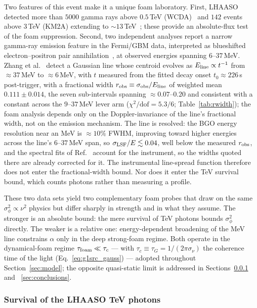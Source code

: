 \documentclass[aps,prd,onecolumn,amsmath,amssymb]{revtex4-2}
\begin{document}
Two features of this event make it a unique foam laboratory.
First, LHAASO detected more than $5000$ gamma rays above $0.5$\,TeV
(WCDA)~\cite{LHAASOWCDA2023} and $142$ events above $3$\,TeV (KM2A) extending to
$\sim\!13$\,TeV~\cite{LHAASOTeV2023}; these provide an absolute-flux
test of the foam suppression.  Second, two independent analyses report a
narrow gamma-ray emission feature in the Fermi/GBM data, interpreted as
blueshifted electron--positron pair
annihilation~\cite{Ravasio2024,YQZhang2024}, at observed energies
spanning $6$--$37$\,MeV.  Zhang et al.~\cite{YQZhang2024} detect a
Gaussian line whose centroid evolves as $E_{\rm line}\propto t^{-1}$
from $\approx37$\,MeV to $\approx6$\,MeV, with $t$ measured from the
fitted decay onset $t_0\approx226$\,s post-trigger, with a fractional width
$r_{\rm obs}\equiv\sigma_{\rm obs}/E_{\rm line}$ of weighted mean
$0.111\pm0.014$, the seven sub-intervals spanning $\approx0.07$--$0.20$ and
consistent with a constant across the $9$--$37$\,MeV lever arm
($\chi^2/\mathrm{dof}=5.3/6$; Table~\ref{tab:rwidth}); the foam analysis depends only
on the Doppler-invariance of the line's fractional width, not on the
emission mechanism.
The line is resolved: the BGO energy resolution near an MeV is
$\approx\!10\%$ FWHM, improving toward higher energies across the line's
$6$--$37$\,MeV span, so $\sigma_{\rm LSF}/E\lesssim0.04$, well below the
measured $r_{\rm obs}$, and the spectral fits of Ref.~\cite{YQZhang2024}
account for the instrument, so the widths quoted there are already
corrected for it.  The instrumental line-spread function therefore does not
enter the fractional-width bound.  Nor does it enter the TeV survival bound,
which counts photons rather than measuring a profile.

These two data sets yield two complementary foam probes that draw on the
same $\sigma_\phi^2\propto\nu^2$ physics but differ sharply in strength
and in what they assume.  The stronger is an absolute bound: the
mere survival of TeV photons bounds $\sigma_\phi^2$ directly.  The
weaker is a relative one: energy-dependent broadening of the MeV
line constrains $\alpha$ only in the deep strong-foam regime.  Both
operate in the dynamical-foam regime $\tau_{\rm foam}\ll\tau_c$ --- with
$\tau_c\equiv\tau_G=1/(2\pi\sigma_\nu)$ the coherence time of the light
(Eq.~\eqref{eq:g1src_gauss}) --- adopted
throughout Section~\ref{sec:model}; the opposite quasi-static limit is
addressed in Sections~\ref{sec:grb_tev} and ~\ref{sec:conclusions}.

\subsubsection{Survival of the LHAASO TeV photons}
\label{sec:grb_tev}
\end{document}
